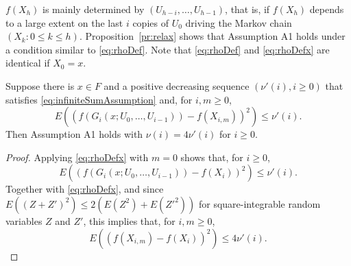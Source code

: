 \documentclass[a4paper,11pt]{article}
\begin{document}
\(f(X_{h})\) is mainly determined by \((U_{h-i},\dots,U_{h-1})\), that is, if \(f(X_{h})\) depends to a large extent on the last \(i\) copies of \(U_{0}\) driving the Markov chain \((X_{k}:0\leq k\le h)\).  
Proposition~\ref{pr:relax} shows that Assumption A1 holds under a condition similar to  \eqref{eq:rhoDef}. Note that   \eqref{eq:rhoDef} and  \eqref{eq:rhoDefx} are identical if \(X_{0}=x\). \begin{proposition}\label{pr:relax}
Suppose there is \(x\in F\) and a positive decreasing sequence \((\nu'(i),i\geq0)\)   that satisfies \eqref{eq:infiniteSumAssumption} and, for \(i,m\geq0\),\begin{equation}\label{eq:rhoDefx}
E((f(G_{i}(x;U_{0},\dots,U_{i-1}))-f(X_{i,m}))^{2})\leq\nu'(i).
\end{equation}
Then Assumption A1 holds with \(\nu(i)=4\nu'(i)\) for \(i\geq0\). 
\end{proposition}
\begin{proof}
Applying \eqref{eq:rhoDefx} with \(m=0\) shows that, for \(i\geq0\), \begin{equation*}
E((f(G_{i}(x;U_{0},\dots,U_{i-1}))-f(X_{i}))^{2})\leq\nu'(i).
\end{equation*} 
Together with  \eqref{eq:rhoDefx}, and since \(E((Z+Z')^{2})\le2(E(Z^{2})+E({Z'}^{2}))\) for square-integrable random variables \(Z\) and \(Z'\), this implies that, for \(i,m\geq0\),
\begin{equation*}
E((f(X_{i,m})-f(X_{i}))^{2})\leq4\nu'(i).
\end{equation*}
\end{proof}  
\end{document}
